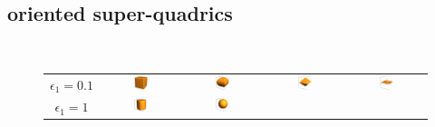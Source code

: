 \subsection{oriented super-quadrics} ~\\

\begin{figure}[htb]
\begin{tabular}{ccccc}
  $\epsilon_1=0.1$
    & \includegraphics[width=0.2\textwidth]{../images/form_factor/supershapes/superquadric111_01_01.png}
    & \includegraphics[width=0.2\textwidth]{../images/form_factor/supershapes/superquadric111_01_1.png}
    & \includegraphics[width=0.2\textwidth]{../images/form_factor/supershapes/superquadric111_01_2.png}
    & \includegraphics[width=0.2\textwidth]{../images/form_factor/supershapes/superquadric111_01_5.png} \\
  $\epsilon_1=1$
    & \includegraphics[width=0.2\textwidth]{../images/form_factor/supershapes/superquadric111_1_01.png}
    & \includegraphics[width=0.2\textwidth]{../images/form_factor/supershapes/superquadric111_1_1.png}

\end{tabular}
\end{figure}

